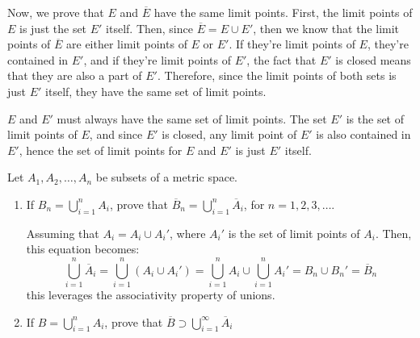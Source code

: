 \documentclass[10pt]{article}
\begin{document}
\begin{solution}
		Now, we prove that \( E \) and \( \overline E \) have the same limit points. First, the limit 
		points of \( E \) is just the set \( E' \) itself. 
		Then, since \( \overline E = E \cup E' \), then we know that the limit points of \( \overline E \) 
		are either limit points of \( E \) or \( E' \). If they're limit points of \( E \), they're contained
		in \( E' \), and if they're limit points of \( E' \), the fact that \( E' \) is closed means that they 
		are also a part of \( E' \). Therefore, since the limit points of both sets is just \( E' \) itself, 
		they have the same set of limit points. 

		\( E \) and \( E' \) must always have the same set of limit points. The set \( E' \) is the set of 
		limit points of \( E \), and since \( E' \) is closed, any limit point of \( E' \) is also contained in 
		\( E' \), hence the set of limit points for \( E \) and \( E' \) is just \( E' \) itself.  
	\end{solution}

	\begin{problem}
		Let \( A_1, A_2, \dots, A_n \) be subsets of a metric space. 
		\begin{enumerate}[label=\alph*)]
			\item If \( B_n = \bigcup_{i = 1}^{n}A_i \), prove that \( \overline B_n = 
				\bigcup_{i = 1}^{n}\overline A_i \), for \( n = 1, 2, 3, \dots \). 

				\begin{solution}
					Assuming that \( A_i = A_i \cup A_i' \), where \( A_i'\) is the set of limit 
					points of \( A_i \). Then, this equation becomes:
					\[
					\bigcup_{i = 1}^{n}\overline A_i = \bigcup_{i = 1} ^{n}(A_i \cup A_i')
					= \bigcup_{i=1} ^{n}A_i \cup \bigcup_{i = 1} ^{n}A_i' = B_n \cup B_n' = \overline B_n 
					\] 
					this leverages the associativity property of unions.  
				\end{solution}
			\item If \( B = \bigcup_{i = 1}^{n}A_i \), prove that \( \overline B \supset 
				\bigcup_{i = 1}^{\infty}\overline A_i \)
		\end{enumerate}
	\end{problem}
\end{document}
